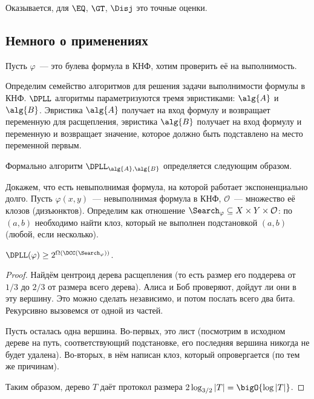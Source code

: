 Оказывается, для $\EQ$, $\GT$, $\Disj$ это точные оценки.


\subsection{Немного о применениях}

Пусть $\varphi$~--- это булева формула в КНФ, хотим проверить её на выполнимость.

Определим семейство алгоритмов для решения задачи выполнимости формулы в КНФ. $\DPLL$ алгоритмы
параметризуются тремя эвристиками: $\alg{A}$ и $\alg{B}$. Эвристика $\alg{A}$ получает на вход формулу и
возвращает переменную для расщепления, эвристика $\alg{B}$ получает на вход формулу и переменную и
возвращает значение, которое должно быть подставлено на место переменной первым.

Формально алгоритм $\DPLL_{\alg{A}, \alg{B}}$ определяется следующим образом.



Докажем, что есть невыполнимая формула, на которой работает экспоненциально долго. Пусть $\varphi(x,
y)$~--- невыполнимая формула в КНФ, $\mathcal{O}$~--- множество её клозов (дизъюнктов). Определим
 как отношение $\Search_{\varphi} \subseteq X \times Y \times
\mathcal{O}$: по $(a, b)$ необходимо найти клоз, который не выполнен подстановкой $(a, b)$ (любой, если
несколько).

\begin{theorem}
    \label{th:DPLL-and-Search}
    $\DPLL(\varphi) \ge 2^{\Omega(\DCC(\Search_{\varphi}))}$.
\end{theorem}


\begin{proof}
    Найдём центроид дерева расщепления (то есть размер его поддерева от $1/3$ до $2/3$ от размера всего
    дерева). Алиса и Боб проверяют, дойдут ли они в эту вершину. Это можно сделать независимо, и потом
    послать всего два бита. Рекурсивно вызовемся от одной из частей.

    Пусть осталась одна вершина. Во-первых, это лист (посмотрим в исходном дереве на путь,
    соответствующий подстановке, его последняя вершина никогда не будет удалена). Во-вторых, в нём
    написан клоз, который опровергается (по тем же причинам).

    Таким образом, дерево $T$ даёт протокол размера $2\log_{3/2} |T| = \bigO{\log |T|}$.
\end{proof}

